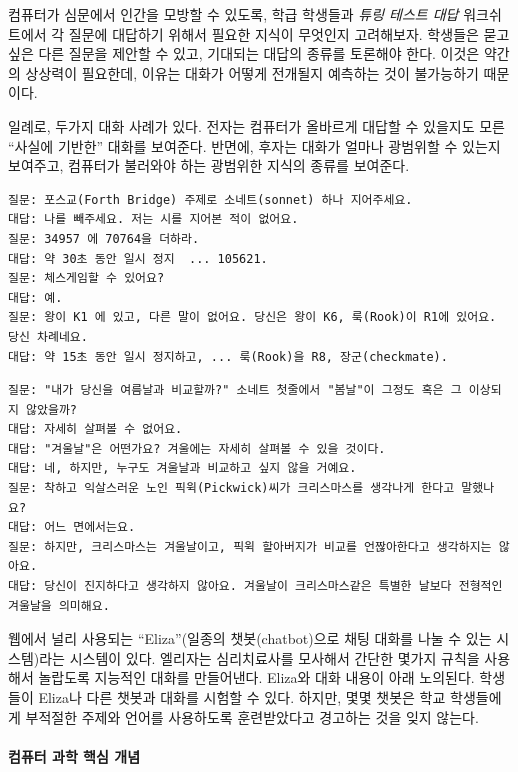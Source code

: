 \documentclass[]{article}
\begin{document}
컴퓨터가 심문에서 인간을 모방할 수 있도록, 학급 학생들과 \emph{튜링
테스트 대답} 워크쉬트에서 각 질문에 대답하기 위해서 필요한 지식이
무엇인지 고려해보자. 학생들은 묻고 싶은 다른 질문을 제안할 수 있고,
기대되는 대답의 종류를 토론해야 한다. 이것은 약간의 상상력이 필요한데,
이유는 대화가 어떻게 전개될지 예측하는 것이 불가능하기 때문이다.

일례로, 두가지 대화 사례가 있다. 전자는 컴퓨터가 올바르게 대답할 수
있을지도 모른 ``사실에 기반한'' 대화를 보여준다. 반면에, 후자는 대화가
얼마나 광범위할 수 있는지 보여주고, 컴퓨터가 불러와야 하는 광범위한
지식의 종류를 보여준다.

\begin{verbatim}
질문: 포스교(Forth Bridge) 주제로 소네트(sonnet) 하나 지어주세요.
대답: 나를 빼주세요. 저는 시를 지어본 적이 없어요.
질문: 34957 에 70764을 더하라.
대답: 약 30초 동안 일시 정지  ... 105621.
질문: 체스게임할 수 있어요?
대답: 예.
질문: 왕이 K1 에 있고, 다른 말이 없어요. 당신은 왕이 K6, 룩(Rook)이 R1에 있어요. 당신 차례네요.
대답: 약 15초 동안 일시 정지하고, ... 룩(Rook)을 R8, 장군(checkmate).
\end{verbatim}

\begin{verbatim}
질문: "내가 당신을 여름날과 비교할까?" 소네트 첫줄에서 "봄날"이 그정도 혹은 그 이상되지 않았을까?
대답: 자세히 살펴볼 수 없어요.
대답: "겨울날"은 어떤가요? 겨울에는 자세히 살펴볼 수 있을 것이다.
대답: 네, 하지만, 누구도 겨울날과 비교하고 싶지 않을 거예요.
질문: 착하고 익살스러운 노인 픽윅(Pickwick)씨가 크리스마스를 생각나게 한다고 말했나요?
대답: 어느 면에서는요.
질문: 하지만, 크리스마스는 겨울날이고, 픽윅 할아버지가 비교를 언짢아한다고 생각하지는 않아요.
대답: 당신이 진지하다고 생각하지 않아요. 겨울날이 크리스마스같은 특별한 날보다 전형적인 겨울날을 의미해요.
\end{verbatim}

웹에서 널리 사용되는 ``Eliza''(일종의 챗봇(chatbot)으로 채팅 대화를 나눌
수 있는 시스템)라는 시스템이 있다. 엘리자는 심리치료사를 모사해서 간단한
몇가지 규칙을 사용해서 놀랍도록 지능적인 대화를 만들어낸다. Eliza와 대화
내용이 아래 노의된다. 학생들이 Eliza나 다른 챗봇과 대화를 시험할 수
있다. 하지만, 몇몇 챗봇은 학교 학생들에게 부적절한 주제와 언어를
사용하도록 훈련받았다고 경고하는 것을 잊지 않는다.

\mbox{}\paragraph{컴퓨터 과학 핵심 개념}\label{section-278}
\end{document}
